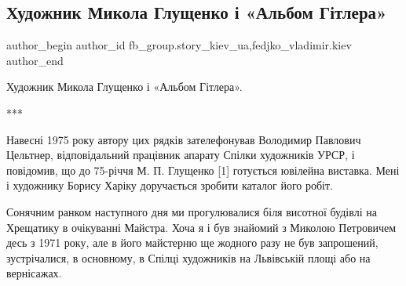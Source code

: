  
 
 
 
 
 
\subsection{Художник Микола Глущенко і «Альбом Гітлера»}
\label{sec:29_11_2021.fb.fb_group.story_kiev_ua.1.albom_gitlera_hudozhnik_gluschenko}
 
\ifcmt
 author_begin
   author_id fb_group.story_kiev_ua,fedjko_vladimir.kiev
 author_end
\fi

Художник Микола Глущенко і «Альбом Гітлера».

***

Навесні 1975 року автору цих рядків зателефонував Володимир Павлович Цельтнер,
відповідальний працівник апарату Спілки художників УРСР, і повідомив, що до
75-річчя М. П. Глущенко [1] готується ювілейна виставка. Мені і художнику
Борису Харіку доручається зробити каталог його робіт.

Сонячним ранком наступного дня ми прогулювалися біля висотної будівлі на
Хрещатику в очікуванні Майстра. Хоча я і був знайомий з Миколою Петровичем десь
з 1971 року, але в його майстерню ще жодного разу не був запрошений,
зустрічалися, в основному, в Спілці художників на Львівській площі або на
вернісажах.

